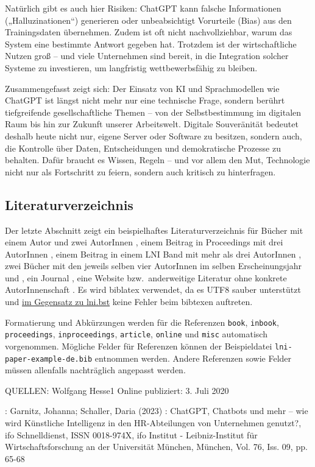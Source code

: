 \documentclass[utf8,biblatex]{bremerhaven_lni}
\begin{document}
Natürlich gibt es auch hier Risiken: ChatGPT kann falsche Informationen („Halluzinationen“) generieren oder unbeabsichtigt Vorurteile (Bias) aus den Trainingsdaten übernehmen. Zudem ist oft nicht nachvollziehbar, warum das System eine bestimmte Antwort gegeben hat. Trotzdem ist der wirtschaftliche Nutzen groß – und viele Unternehmen sind bereit, in die Integration solcher Systeme zu investieren, um langfristig wettbewerbsfähig zu bleiben.

Zusammengefasst zeigt sich: Der Einsatz von KI und Sprachmodellen wie ChatGPT ist längst nicht mehr nur eine technische Frage, sondern berührt tiefgreifende gesellschaftliche Themen – von der Selbstbestimmung im digitalen Raum bis hin zur Zukunft unserer Arbeitswelt. Digitale Souveränität bedeutet deshalb heute nicht nur, eigene Server oder Software zu besitzen, sondern auch, die Kontrolle über Daten, Entscheidungen und demokratische Prozesse zu behalten. Dafür braucht es Wissen, Regeln – und vor allem den Mut, Technologie nicht nur als Fortschritt zu feiern, sondern auch kritisch zu hinterfragen.


\subsection{Literaturverzeichnis}
Der letzte Abschnitt zeigt ein beispielhaftes Literaturverzeichnis für Bücher mit einem Autor \cite{Ez10} und zwei AutorInnen \cite{AB00}, einem Beitrag in Proceedings mit drei AutorInnen \cite{ABC01}, einem Beitrag in einem LNI Band mit mehr als drei AutorInnen \cite{Az09}, zwei Bücher mit den jeweils selben vier AutorInnen im selben Erscheinungsjahr \cite{Wa14} und \cite{Wa14b}, ein Journal \cite{Gl06}, eine Website \cite{GI19} bzw.\ anderweitige Literatur ohne konkrete AutorInnenschaft \cite{XX14}.
Es wird biblatex verwendet, da es UTF8 sauber unterstützt und \href{https://github.com/gi-ev/LNI/issues/5}{im Gegensatz zu lni.bst} keine Fehler beim bibtexen auftreten.

Formatierung und Abkürzungen werden für die Referenzen \texttt{book}, \texttt{inbook}, \texttt{proceedings}, \texttt{inproceedings}, \texttt{article}, \texttt{online} und \texttt{misc} automatisch vorgenommen.
Mögliche Felder für Referenzen können der Beispieldatei \texttt{lni-paper-example-de.bib} entnommen werden.
Andere Referenzen sowie Felder müssen allenfalls nachträglich angepasst werden.

QUELLEN:
Wolfgang Hesse1
Online publiziert: 3. Juli 2020


: Garnitz, Johanna; Schaller, Daria (2023) : ChatGPT, Chatbots und mehr – wie
wird Künstliche Intelligenz in den HR-Abteilungen von Unternehmen genutzt?, ifo Schnelldienst,
ISSN 0018-974X, ifo Institut - Leibniz-Institut für Wirtschaftsforschung an der Universität München,
München, Vol. 76, Iss. 09, pp. 65-68
\end{document}
